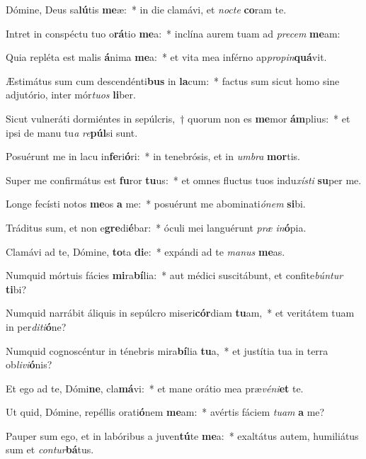 \item Dómine, Deus sa\textbf{lú}tis \textbf{me}æ:~* in die clamávi, et \textit{noc}\textit{te} \textbf{co}ram te.
\item Intret in conspéctu tuo o\textbf{rá}tio \textbf{me}a:~* inclína aurem tuam ad \textit{pre}\textit{cem} \textbf{me}am:
\item Quia repléta est malis \textbf{á}nima \textbf{me}a:~* et vita mea inférno ap\textit{pro}\textit{pin}\textbf{quá}vit.
\item Æstimátus sum cum descendénti\textbf{bus} in \textbf{la}cum:~* factus sum sicut homo sine adjutório, inter mór\textit{tu}\textit{os} \textbf{li}ber.
\item Sicut vulneráti dormiéntes in sepúlcris,~† quorum non es \textbf{me}mor \textbf{ám}plius:~* et ipsi de manu tu\textit{a} \textit{re}\textbf{púl}si sunt.
\item Posuérunt me in lacu in\textbf{fe}ri\textbf{ó}ri:~* in tenebrósis, et in \textit{um}\textit{bra} \textbf{mor}tis.
\item Super me confirmátus est \textbf{fu}ror \textbf{tu}us:~* et omnes fluctus tuos indu\textit{xís}\textit{ti} \textbf{su}per me.
\item Longe fecísti notos \textbf{me}os \textbf{a} me:~* posuérunt me abominati\textit{ó}\textit{nem} \textbf{si}bi.
\item Tráditus sum, et non e\textbf{gre}di\textbf{é}bar:~* óculi mei languérunt \textit{præ} \textit{in}\textbf{ó}pia.
\item Clamávi ad te, Dómine, \textbf{to}ta \textbf{di}e:~* expándi ad te \textit{ma}\textit{nus} \textbf{me}as.
\item Numquid mórtuis fácies \textbf{mi}ra\textbf{bí}lia:~* aut médici suscitábunt, et confite\textit{bún}\textit{tur} \textbf{ti}bi?
\item Numquid narrábit áliquis in sepúlcro miseri\textbf{cór}diam \textbf{tu}am,~* et veritátem tuam in per\textit{di}\textit{ti}\textbf{ó}ne?
\item Numquid cognoscéntur in ténebris mira\textbf{bí}lia \textbf{tu}a,~* et justítia tua in terra ob\textit{li}\textit{vi}\textbf{ó}nis?
\item Et ego ad te, Dómi\textbf{ne}, cla\textbf{má}vi:~* et mane orátio mea præ\textit{vé}\textit{ni}\textbf{et} te.
\item Ut quid, Dómine, repéllis orati\textbf{ó}nem \textbf{me}am:~* avértis fáciem \textit{tu}\textit{am} \textbf{a} me?
\item Pauper sum ego, et in labóribus a juven\textbf{tú}te \textbf{me}a:~* exaltátus autem, humiliátus sum et \textit{con}\textit{tur}\textbf{bá}tus.
